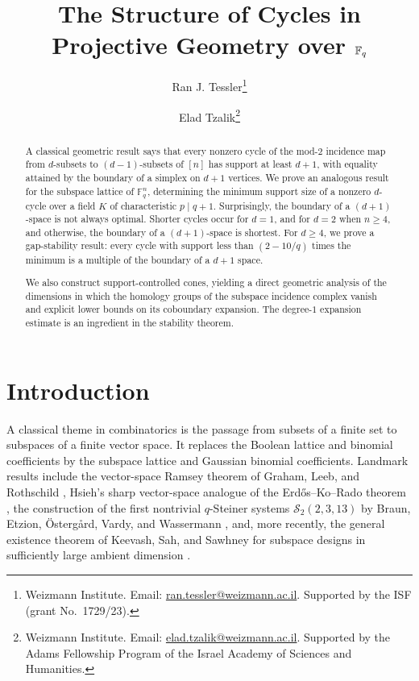 \documentclass[11pt]{article}
\title{The Structure of Cycles in Projective Geometry over $\F_q$}
\author{
Ran J. Tessler\thanks{Weizmann Institute. Email:
\href{mailto:ran.tessler@weizmann.ac.il}{ran.tessler@weizmann.ac.il}.
Supported by the ISF (grant No.~1729/23).}
\and
Elad Tzalik\thanks{Weizmann Institute. Email:
\href{mailto:elad.tzalik@weizmann.ac.il}{elad.tzalik@weizmann.ac.il}.
Supported by the Adams Fellowship Program of
the Israel Academy of Sciences and Humanities.}
}
\date{}
\numberwithin{equation}{section}
\newcommand{\F}{\mathbb F}
\begin{document}
\maketitle
\vspace{-1.2em}

\begin{abstract}

A classical geometric result says that every nonzero cycle of the mod-$2$ incidence map from $d$-subsets to $(d-1)$-subsets of $[n]$ has support at least $d+1$, with equality attained by the boundary of a simplex on $d+1$ vertices. We prove an analogous result for the subspace lattice of $\F_q^n$, determining the minimum support size of a nonzero $d$-cycle over a field $K$ of characteristic $p \mid q+1$.
Surprisingly, the boundary of a $(d+1)$-space is not always optimal. Shorter cycles occur for $d=1$, and for $d=2$ when $n\ge4$, and otherwise, the boundary of a $(d+1)$-space is shortest. For $d\ge4$, we prove a gap-stability result: every cycle with support less than $(2-10/q)$ times the minimum is a multiple of the boundary of a $d+1$ space.

We also construct support-controlled cones, yielding a direct geometric analysis of the dimensions in which the homology groups of the subspace incidence complex vanish and explicit lower bounds on its coboundary expansion. The degree-$1$ expansion estimate is an ingredient in the stability theorem.
\end{abstract}

\section{Introduction}

A classical theme in combinatorics is the passage from subsets of a finite set to subspaces of a finite vector space. It replaces the Boolean lattice and binomial coefficients by the subspace lattice and Gaussian binomial coefficients. Landmark results include the vector-space Ramsey theorem of Graham, Leeb, and Rothschild \cite{GrahamLeebRothschild1972}, Hsieh's sharp vector-space analogue of the Erd\H{o}s--Ko--Rado theorem \cite{Hsieh1975}, the construction of the first nontrivial $q$-Steiner systems $\mathcal{S}_2(2,3,13)$ by Braun, Etzion, {\"O}sterg{\aa}rd, Vardy, and Wassermann \cite{BraunEtAl2016}, and, more recently, the general existence theorem of Keevash, Sah, and Sawhney for subspace designs in sufficiently large ambient dimension \cite{KeevashSahSawhney2025}.
\end{document}
